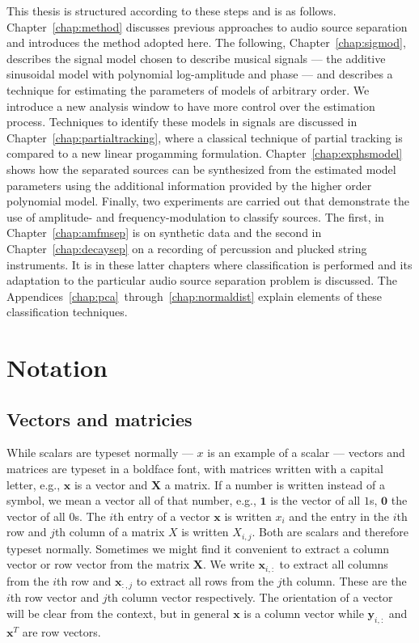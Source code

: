 This thesis is structured according to these steps and is as follows.
Chapter~\ref{chap:method} discusses previous approaches to audio source
separation and introduces the method adopted here. The following,
Chapter~\ref{chap:sigmod}, describes the signal model chosen to describe musical
signals --- the additive sinusoidal model with polynomial log-amplitude and
phase --- and describes a technique for estimating the parameters of models of
arbitrary order. We introduce a new analysis window to have more control over the
estimation process. Techniques to identify these models in signals are discussed in
Chapter~\ref{chap:partialtracking}, where a classical technique of partial
tracking is compared to a new linear progamming formulation.
Chapter~\ref{chap:exphsmodel} shows how the separated sources can be synthesized
from the estimated model parameters using the additional information provided by
the higher order polynomial model. Finally, two experiments are carried out that
demonstrate the use of amplitude- and frequency-modulation to classify sources.
The first, in Chapter~\ref{chap:amfmsep} is on synthetic data and the second in
Chapter~\ref{chap:decaysep} on a recording of percussion and plucked string
instruments. It is in these latter chapters where classification is performed
and its adaptation to the particular audio source separation problem is
discussed. The Appendices~\ref{chap:pca}~through~\ref{chap:normaldist} explain
elements of these classification techniques.

\section{Notation}

\subsection{Vectors and matricies}

While scalars are typeset normally --- $x$ is an example of a scalar --- vectors
and matrices are typeset in a boldface font, with matrices written with a
capital letter, e.g., $\boldsymbol{x}$ is a vector and $\boldsymbol{X}$ a
matrix. If a number is written instead of a symbol, we mean a vector all of that
number, e.g., $\boldsymbol{1}$ is the vector of all $1$s, $\boldsymbol{0}$ the
vector of all $0$s. The $i$th entry of a vector $\boldsymbol{x}$ is written
$x_{i}$ and the entry in the $i$th row and $j$th column of a matrix $X$ is
written $X_{i,j}$.  Both are scalars and therefore typeset normally. Sometimes
we might find it convenient to extract a column vector or row vector from the
matrix $\boldsymbol{X}$. We write $\boldsymbol{x}_{i,:}$ to extract all columns
from the $i$th row and $\boldsymbol{x}_{:,j}$ to extract all rows from the
$j$th column. These are the $i$th row vector and $j$th column vector
respectively. The orientation of a vector will be clear from the context, but in
general $\boldsymbol{x}$ is a column vector while $\boldsymbol{y}_{i,:}$ and
$\boldsymbol{x}^{T}$ are row vectors.

